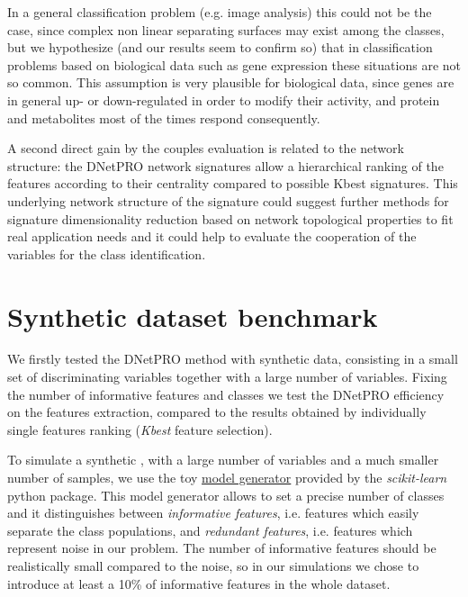 \documentclass{standalone}
\begin{document}
In a general classification problem (e.g. image analysis) this could not be the case, since complex non linear separating surfaces may exist among the classes, but we hypothesize (and our results seem to confirm so) that in classification problems based on biological data such as gene expression these situations are not so common.
This assumption is very plausible for biological data, since genes are in general up- or down-regulated in order to modify their activity, and protein and metabolites most of the times respond consequently.

A second direct gain by the couples evaluation is related to the network structure: the DNetPRO network signatures allow a hierarchical ranking of the features according to their centrality compared to possible Kbest signatures.
This underlying network structure of the signature could suggest further methods for signature dimensionality reduction based on network topological properties to fit real application needs and it could help to evaluate the cooperation of the variables for the class identification.





\section[Toy Model]{Synthetic dataset benchmark}\label{toy}

We firstly tested the DNetPRO method with synthetic data, consisting in a small set of discriminating variables together with a large number of  variables.
Fixing the number of informative features and classes we test the DNetPRO efficiency on the features extraction, compared to the results obtained by individually single features ranking (\emph{Kbest} feature selection).

To simulate a synthetic , with a large number of variables and a much smaller number of samples, we use the toy \href{https://scikit-learn.org/stable/modules/generated/sklearn.datasets.make_classification.html}{model generator} provided by the \emph{scikit-learn}~\cite{scikit-learn} python package.
This model generator allows to set a precise number of classes and it distinguishes between \emph{informative features}, i.e. features which easily separate the class populations, and \emph{redundant features}, i.e. features which represent noise in our problem.
The number of informative features should be realistically small compared to the noise, so in our simulations we chose to introduce at least a 10\% of informative features in the whole dataset.


\end{document}
